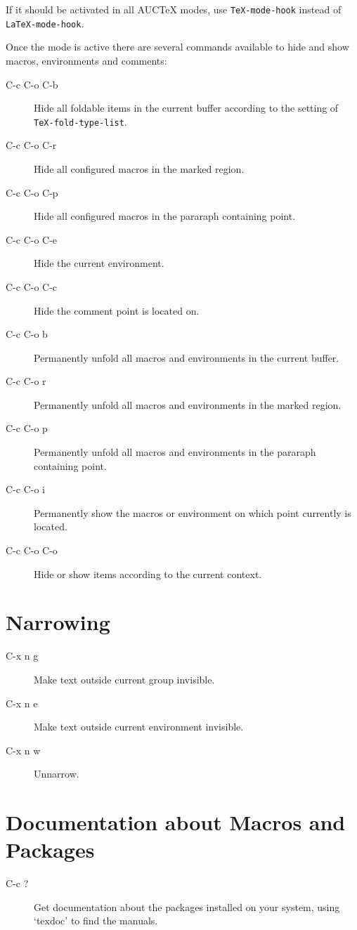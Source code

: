 If it should be activated in all AUCTeX modes, use \verb|TeX-mode-hook| instead of \verb|LaTeX-mode-hook|.

Once the mode is active there are several commands available to hide and show macros, environments and comments:
\begin{description}
\item[C-c C-o C-b] Hide all foldable items in the current buffer according to the setting of \verb|TeX-fold-type-list|.
\item[C-c C-o C-r] Hide all configured macros in the marked region.
\item[C-c C-o C-p] Hide all configured macros in the pararaph containing point.
\item[C-c C-o C-e] Hide the current environment.
\item[C-c C-o C-c] Hide the comment point is located on.
\item[C-c C-o b] Permanently unfold all macros and environments in the current buffer.
\item[C-c C-o r] Permanently unfold all macros and environments in the marked region.
\item[C-c C-o p] Permanently unfold all macros and environments in the pararaph containing point.
\item[C-c C-o i] Permanently show the macros or environment on which point currently is located.
\item[C-c C-o C-o] Hide or show items according to the current context.
\end{description}

\section{Narrowing}

\begin{description}
\item[C-x n g] Make text outside current group invisible.
\item[C-x n e] Make text outside current environment invisible.
\item[C-x n w] Unnarrow.
\end{description}


\section{Documentation about Macros and Packages}
\begin{description}
\item[C-c ?] Get documentation about the packages installed on your system, using ‘texdoc’ to find the manuals. 
\end{description}


